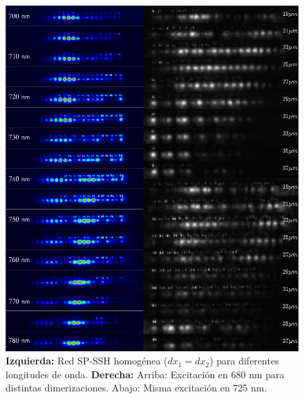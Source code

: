 \begin{figure}[H]
	\centering
	\includegraphics[width=\linewidth]{media/sp-ssh-exp.png}
	\caption[Caracterización experimental de redes SP-SSH]{
		\textbf{Izquierda:} Red SP-SSH homogénea ($dx_1 = dx_2$) para diferentes longitudes de onda. 
		\textbf{Derecha:} Arriba: Excitación en 680 nm para distintas dimerizaciones. 
		Abajo: Misma excitación en 725 nm.
		\label{fig:sp-ssh-exp}}
\end{figure}